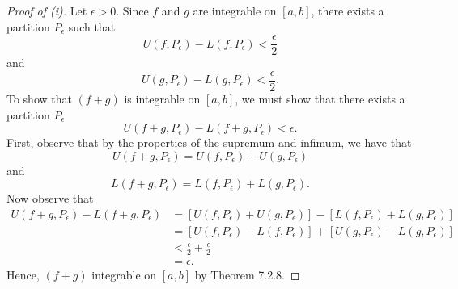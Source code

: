 \begin{proof}[Proof of (i)]
	Let \( \epsilon > 0 \). Since \( f \) and \( g  \) are integrable on \( [a,b]  \), there exists a partition \( P_{\epsilon } \) such that 
	\[  U(f, P_{\epsilon }) - L(f, P_{\epsilon }) < \frac{ \epsilon  }{ 2 }   \]
	and 
	\[  U(g, P_{\epsilon }) - L(g, P_{\epsilon }) < \frac{ \epsilon  }{ 2 } . \]
	To show that \( (f+g)  \) is integrable on \( [a,b] \), we must show that there exists a partition \( P_{\epsilon } \)
	\[  U(f+g, P_{\epsilon }) - L(f +g, P_{\epsilon }) < \epsilon. \]
	First, observe that by the properties of the supremum and infimum, we have 
	that 
	\[  U(f+g, P_{\epsilon }) = U(f, P_{\epsilon }) + U(g, P_{\epsilon }) \]
	and 
	\[  L(f+g, P_{\epsilon }) = L(f, P_{\epsilon }) + L(g, P_{\epsilon }). \]
	Now observe that
	\begin{align*}
		U(f+g, P_{\epsilon }) - L(f+g, P_{\epsilon }) &= [U(f,P_{\epsilon }) + U(g, P_{\epsilon })] - [L(f,P_{\epsilon }) + L(g, P_{\epsilon })] \\
													  &= [U(f,P_{\epsilon }) - L(f,P_{\epsilon })] + [U(g, P_{\epsilon }) - L(g, P_{\epsilon })] \\
													  &< \frac{ \epsilon  }{ 2 }  + \frac{ \epsilon  }{ 2 } \\
													  &= \epsilon.
	\end{align*}
	Hence, \( (f+g)  \) integrable on \( [a,b]  \) by Theorem 7.2.8.  


\end{proof}
